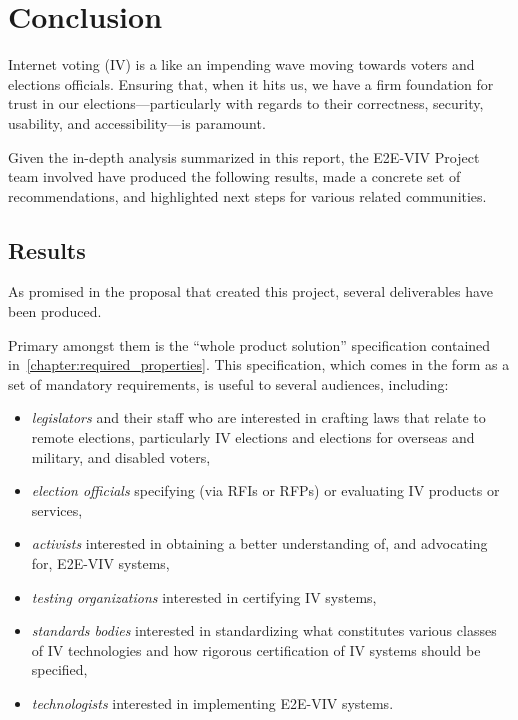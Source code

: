 \chapter{Conclusion}
\label{chapter:conclusion}

Internet voting (IV) is a like an impending wave moving towards voters and elections
officials.  Ensuring that, when it hits us, we have a firm foundation
for trust in our elections---particularly with regards to their
correctness, security, usability, and accessibility---is paramount.

Given the in-depth analysis summarized in this report, the E2E-VIV
Project team involved have produced the following
results, made a concrete set of recommendations, and highlighted next
steps for various related communities.

\section{Results}

As promised in the proposal that created this project,
several deliverables have been produced.  

Primary amongst them is the ``whole product solution'' specification
contained in~\autoref{chapter:required_properties}. This
specification, which comes in the form as a set of mandatory
requirements, is useful to several audiences, including:
\begin{itemize}
\item \emph{legislators} and their staff who are interested in
  crafting laws that relate to remote elections, particularly IV
  elections and elections for overseas and military, and disabled voters,
\item \emph{election officials} specifying (via RFIs or RFPs) or
  evaluating IV products or services,
\item \emph{activists} interested in obtaining a better understanding
  of, and advocating for, E2E-VIV systems,
\item \emph{testing organizations} interested in certifying IV
  systems,
\item \emph{standards bodies} interested in standardizing what
  constitutes various classes of IV technologies and how rigorous
  certification of IV systems should be specified,
\item \emph{technologists} interested in implementing E2E-VIV systems.
\end{itemize}

